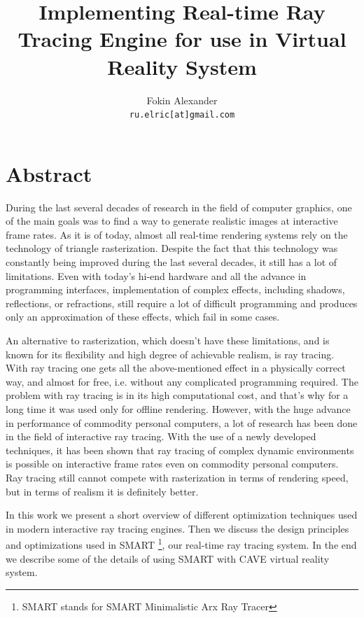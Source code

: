 \documentclass{article}
\author{Fokin Alexander\\ \texttt{ru.elric[at]gmail.com} }
\title{Implementing Real-time Ray Tracing Engine for use in Virtual Reality System}
\begin{document}
\pagestyle{empty}
\maketitle
\thispagestyle{empty}
\cleardoublepage
\tableofcontents
\cleardoublepage
\pagestyle{headings}
\setcounter{page}{3}

\section*{Abstract}
During the last several decades of research in the field of computer graphics, one of the main goals was to find a way to generate realistic images at interactive frame rates. As it is of today, almost all real-time rendering systems rely on the technology of triangle rasterization. Despite the fact that this technology was constantly being improved during the last several decades, it still has a lot of limitations. Even with today's hi-end hardware and all the advance in programming interfaces, implementation of complex effects, including shadows, reflections, or refractions, still require a lot of difficult programming and produces only an approximation of these effects, which fail in some cases.

An alternative to rasterization, which doesn't have these limitations, and is known for its flexibility and high degree of achievable realism, is ray tracing. With ray tracing one gets all the above-mentioned effect in a physically correct way, and almost for free, i.e. without any complicated programming required. The problem with ray tracing is in its high computational cost, and that's why for a long time it was used only for offline rendering. However, with the huge advance in performance of commodity personal computers, a lot of research has been done in the field of interactive ray tracing. With the use of a newly developed techniques, it has been shown that ray tracing of complex dynamic environments is possible on interactive frame rates even on commodity personal computers. Ray tracing still cannot compete with rasterization in terms of rendering speed, but in terms of realism it is definitely better.

In this work we present a short overview of different optimization techniques used in modern interactive ray tracing engines. Then we discuss the design principles and optimizations used in SMART \footnote[1]{SMART stands for SMART Minimalistic Arx Ray Tracer}, our real-time ray tracing system. In the end we describe some of the details of using SMART with CAVE virtual reality system.
\end{document}
